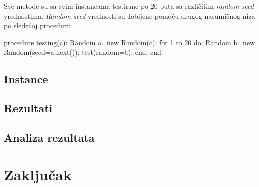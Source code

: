 \documentclass[a4paper]{article}
\begin{document}
Sve metode su sa svim instancama testirane po 20 puta sa različitim \emph{random seed} vrednostima. \emph{Random seed} vrednosti su dobijene pomoću drugog nasumičnog niza po sledećoj proceduri:

\begin{algorithm}
procedure testing(c):
	Random a=new Random(c);
	for 1 to 20 do:
		Random b=new Random(seed=a.next());
		test(random=b);
	end;
end.
\end{algorithm}

\subsection{Instance}
\subsection{Rezultati}
\subsection{Analiza rezultata}
\section{Zaključak}


\appendix
 

\end{document}
